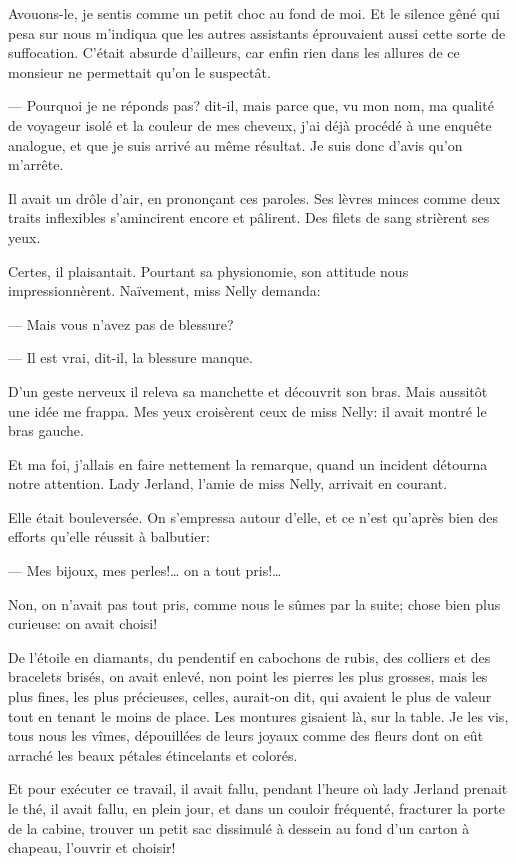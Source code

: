 \documentclass[12pt,a4paper]{book}
\begin{document}
Avouons-le, je sentis comme un petit choc au fond de moi. Et le silence gêné qui pesa sur nous m’indiqua que les autres assistants éprouvaient aussi cette sorte de suffocation. C’était absurde d’ailleurs, car enfin rien dans les allures de ce monsieur ne permettait qu’on le suspectât.

— Pourquoi je ne réponds pas? dit-il, mais parce que, vu mon nom, ma qualité de voyageur isolé et la couleur de mes cheveux, j’ai déjà procédé à une enquête analogue, et que je suis arrivé au même résultat. Je suis donc d’avis qu’on m’arrête.

Il avait un drôle d’air, en prononçant ces paroles. Ses lèvres minces comme deux traits inflexibles s’amincirent encore et pâlirent. Des filets de sang strièrent ses yeux.

Certes, il plaisantait. Pourtant sa physionomie, son attitude nous impressionnèrent. Naïvement, miss Nelly demanda:

— Mais vous n’avez pas de blessure?

— Il est vrai, dit-il, la blessure manque.

D’un geste nerveux il releva sa manchette et découvrit son bras. Mais aussitôt une idée me frappa. Mes yeux croisèrent ceux de miss Nelly: il avait montré le bras gauche.

Et ma foi, j’allais en faire nettement la remarque, quand un incident détourna notre attention. Lady Jerland, l’amie de miss Nelly, arrivait en courant.

Elle était bouleversée. On s’empressa autour d’elle, et ce n’est qu’après bien des efforts qu’elle réussit à balbutier:

— Mes bijoux, mes perles!… on a tout pris!…

Non, on n’avait pas tout pris, comme nous le sûmes par la suite; chose bien plus curieuse: on avait choisi!

De l’étoile en diamants, du pendentif en cabochons de rubis, des colliers et des bracelets brisés, on avait enlevé, non point les pierres les plus grosses, mais les plus fines, les plus précieuses, celles, aurait-on dit, qui avaient le plus de valeur tout en tenant le moins de place. Les montures gisaient là, sur la table. Je les vis, tous nous les vîmes, dépouillées de leurs joyaux comme des fleurs dont on eût arraché les beaux pétales étincelants et colorés.

Et pour exécuter ce travail, il avait fallu, pendant l’heure où lady Jerland prenait le thé, il avait fallu, en plein jour, et dans un couloir fréquenté, fracturer la porte de la cabine, trouver un petit sac dissimulé à dessein au fond d’un carton à chapeau, l’ouvrir et choisir!
\end{document}
